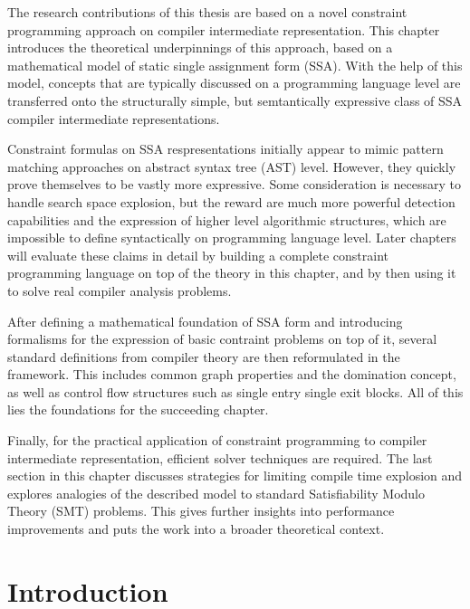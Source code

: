 
    The research contributions of this thesis are based on a novel constraint
    programming approach on compiler intermediate representation.
    This chapter introduces the theoretical underpinnings of this approach,
    based on a mathematical model of static single assignment form (SSA).
    With the help of this model, concepts that are typically discussed on a
    programming language level are transferred onto the structurally simple,
    but semtantically expressive class of SSA compiler intermediate
    representations.

    Constraint formulas on SSA respresentations initially appear to mimic
    pattern matching approaches on abstract syntax tree (AST) level.
    However, they quickly prove themselves to be vastly more expressive.
    Some consideration is necessary to handle search space explosion, but
    the reward are much more powerful detection capabilities and the expression
    of higher level algorithmic structures, which are impossible to define
    syntactically on programming language level.
    Later chapters will evaluate these claims in detail by building a complete
    constraint programming language on top of the theory in this chapter, and
    by then using it to solve real compiler analysis problems.

    After defining a mathematical foundation of SSA form and introducing
    formalisms for the expression of basic contraint problems on top of it,
    several standard definitions from compiler theory are then reformulated in
    the framework.
    This includes common graph properties and the domination concept, as well
    as control flow structures such as single entry single exit blocks.
    All of this lies the foundations for the succeeding chapter.

    Finally, for the practical application of constraint programming to compiler
    intermediate representation, efficient solver techniques are required.
    The last section in this chapter discusses strategies for limiting
    compile time explosion and explores analogies of the described model to
    standard Satisfiability Modulo Theory (SMT) problems.
    This gives further insights into performance improvements and puts the
    work into a broader theoretical context.

\section{Introduction}


